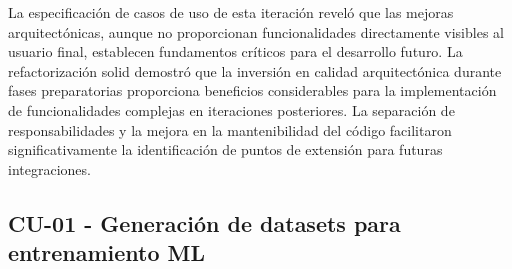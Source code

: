La especificación de casos de uso de esta iteración reveló que las mejoras arquitectónicas, aunque no proporcionan funcionalidades directamente visibles al usuario final, establecen fundamentos críticos para el desarrollo futuro. La refactorización \acrshort{solid} demostró que la inversión en calidad arquitectónica durante fases preparatorias proporciona beneficios considerables para la implementación de funcionalidades complejas en iteraciones posteriores. La separación de responsabilidades y la mejora en la mantenibilidad del código facilitaron significativamente la identificación de puntos de extensión para futuras integraciones.

\subsection{CU-01 - Generación de datasets para entrenamiento ML}
\label{subsec:cu01_it2_datasets_ml}

